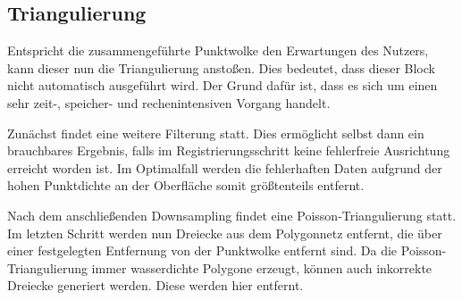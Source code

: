 \subsection{Triangulierung}
\label{subsec:pipeline-triangulierung}

Entspricht die zusammengeführte Punktwolke den Erwartungen des Nutzers, kann dieser nun die Triangulierung anstoßen.
Dies bedeutet, dass dieser Block nicht automatisch ausgeführt wird.
Der Grund dafür ist, dass es sich um einen sehr zeit-, speicher- und rechenintensiven Vorgang handelt.

Zunächst findet eine weitere Filterung statt.
Dies ermöglicht selbst dann ein brauchbares Ergebnis, falls im Registrierungsschritt keine fehlerfreie Ausrichtung erreicht worden ist.
Im Optimalfall werden die fehlerhaften Daten aufgrund der hohen Punktdichte an der Oberfläche somit größtenteils entfernt.

Nach dem anschließenden Downsampling findet eine Poisson-Triangulierung statt.
Im letzten Schritt werden nun Dreiecke aus dem Polygonnetz entfernt, die über einer festgelegten Entfernung von der Punktwolke entfernt sind.
Da die Poisson-Triangulierung immer wasserdichte Polygone erzeugt, können auch inkorrekte Dreiecke generiert werden.
Diese werden hier entfernt.

